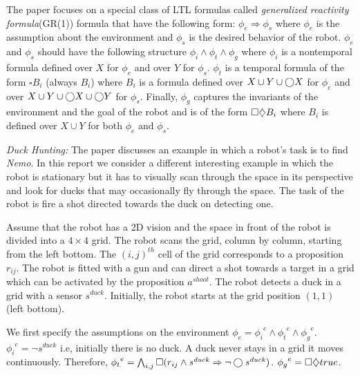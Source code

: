 The paper focuses on a special class of LTL formulas called \emph{generalized reactivity formula}(GR(1)) formula
that have the following form: $\phi_e \Rightarrow \phi_s$  where $\phi_e$ is the assumption
about the environment and $\phi_s$ is the desired behavior of the robot.
$\phi_e$ and $\phi_s$ should have the following structure $\phi_i \wedge \phi_t \wedge \phi_g$ where
$\phi_i$ is a nontemporal formula defined over $X$ for $\phi_e$ and over $Y$ for $\phi_s$. 
$\phi_t$ is a temporal formula of the form $\square B_i$ (always $B_i$) where $B_i$ is a formula 
defined over $X \cup Y \cup \bigcirc X$ for $\phi_e$ and over $X \cup Y \cup \bigcirc X \cup \bigcirc Y$ for
$\phi_s$. Finally, $\phi_g$ captures the invariants of the environment and the goal of the robot 
and is of the form $\square \diamondsuit B_i$
where $B_i$ is defined over $X \cup Y$ for both $\phi_e$ and $\phi_s$.

\newcommand{\shoot}{\mathit{a^{shoot}}}
\newcommand{\duck}{\mathit{s^{duck}}}
\newcommand{\collect}[1]{\mathit{s^{collect_{#1}}}}

\textit{Duck Hunting:} The paper discusses an example in which a robot's task is to find \emph{Nemo}.
In this report we consider a different interesting example in which the robot is stationary but
it has to visually scan through the space in its perspective and look for ducks that may occasionally 
fly through the space. The task of the robot is fire a shot directed towards the duck on detecting one.

Assume that the robot has a 2D vision and the space in front of the robot is divided into a $4 \times 4$ grid.
The robot scans the grid, column by column, starting from the left bottom. 
The $(i,j)^{th}$ cell of the grid corresponds to a proposition $r_{ij}$.
The robot is fitted with a gun and can direct a shot towards a target in a grid which can be activated 
by the proposition $\shoot$. The robot detects a duck in a grid with a sensor $\duck$.
Initially, the robot starts at the grid position $(1,1)$ (left bottom).

We first specify the assumptions on the environment $\phi_e = {\phi_i}^e \wedge {\phi_t}^e \wedge {\phi_g}^e$.
${\phi_i}^e = \neg \duck$ i.e, initially there is no duck. 
A duck never stays in a grid it moves continuously. Therefore,
${\phi_t}^e = \bigwedge_{i,j} \always (r_{ij} \wedge \duck \Rightarrow \neg \next \duck)$.
${\phi_g}^e = \square \diamondsuit true$.

